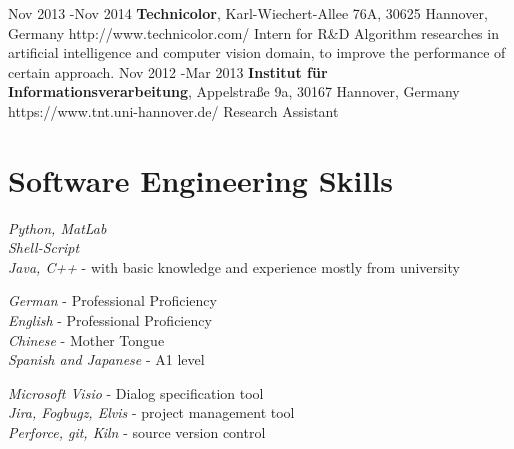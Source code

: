 \documentclass[10pt]{article} %
\begin{document}

\job
{Nov 2013 -}{Nov 2014}
{{\bf Technicolor}, Karl-Wiechert-Allee 76A, 30625 Hannover, Germany}
{http://www.technicolor.com/}
{Intern for R\&D}
{Algorithm researches in artificial intelligence and computer vision domain, to improve the performance of certain approach.} 
\job
{Nov 2012 -}{Mar 2013}
{{\bf Institut f\"ur Informationsverarbeitung}, Appelstra{\ss}e 9a, 30167 Hannover, Germany}
{https://www.tnt.uni-hannover.de/}
{Research Assistant}


\section{Software Engineering Skills}

{
\textit{Python, MatLab}\\
\textit{Shell-Script}\\
\textit{Java, C++} - with basic knowledge and experience mostly from university\\
}


{
\textit{German} - Professional Proficiency\\
\textit{English} - Professional Proficiency\\
\textit{Chinese} - Mother Tongue\\
\textit{Spanish and Japanese} - A1 level\\
}


{
\textit{Microsoft Visio} - Dialog specification tool\\
\textit{Jira, Fogbugz, Elvis} - project management tool\\
\textit{Perforce, git, Kiln} - source version control \\
}
\end{document}
